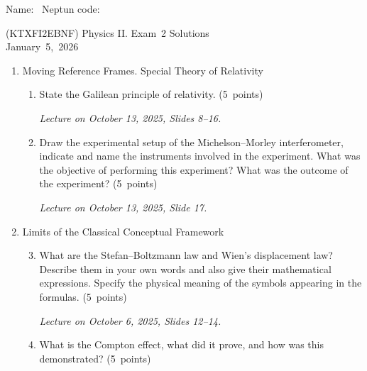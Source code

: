 \documentclass[a4paper,12pt]{letter}
\begin{document}
Name: \hrulefill\ Neptun code: \hrulefill

\bigskip

\begin{center}
(KTXFI2EBNF) Physics II. Exam~2 Solutions\\
January~5,~2026
\end{center}

\bigskip
 
\begin{enumerate}[label=\Roman*.]
   
\item Moving Reference Frames. Special Theory of Relativity

\begin{enumerate}[label=\arabic*.]
\setcounter{enumii}{0} %

\item State the Galilean principle of relativity. \hfill (5~points)

\smallskip
\textit{Lecture on October 13, 2025, Slides 8--16.}

\item Draw the experimental setup of the Michelson–Morley interferometer, indicate and name the instruments involved in the experiment. What was the objective of performing this experiment? What was the outcome of the experiment? \hfill (5~points)

\smallskip
\textit{Lecture on October 13, 2025, Slide 17.}


\end{enumerate}


\item Limits of the Classical Conceptual Framework

\begin{enumerate}[label=\arabic*.]
\setcounter{enumii}{2} %

\item What are the Stefan–Boltzmann law and Wien’s displacement law? Describe them in your own words and also give their mathematical expressions. Specify the physical meaning of the symbols appearing in the formulas. \hfill (5~points)

\smallskip
\textit{Lecture on October 6, 2025, Slides 12--14.}
  
\item What is the Compton effect, what did it prove, and how was this demonstrated?  \hfill (5~points)


\end{enumerate}
\end{enumerate}
\end{document}

